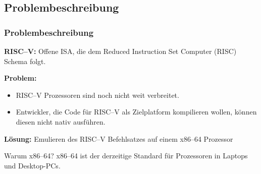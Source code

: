 \subsection{Problembeschreibung} %
\begin{frame}
    \frametitle{Problembeschreibung}

    \vspace{0.50cm}

    \textbf{RISC--V:} Offene ISA, die dem Reduced Instruction Set Computer (RISC) Schema folgt.

    \vspace{0.50cm}

    \textbf{Problem:}
    \begin{itemize}
        \item RISC--V Prozessoren sind noch nicht weit verbreitet.
        \item Entwickler, die Code für RISC--V als Zielplatform kompilieren wollen, können diesen nicht nativ ausführen.
    \end{itemize}

    \vspace{0.50cm}

    \textbf{Lösung:} Emulieren des RISC--V Befehlsatzes auf einem x86--64 Prozessor

    \vspace{0.50cm}

    \begin{block}{Warum x86--64?}
        x86--64 ist der derzeitige Standard für Prozessoren in Laptops und Desktop-PCs.
    \end{block}
\end{frame}

